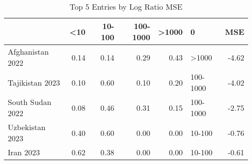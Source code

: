 \begin{table}
\centering
\caption{Top 5 Entries by Log Ratio MSE}
\label{tab:top5_mse}
\begin{tabular}{lrrrrlr}
\toprule
{} &  <10 &  10-100 &  100-1000 &  >1000 &         0 &   MSE \\
\midrule
Afghanistan 2022 & 0.14 &    0.14 &      0.29 &   0.43 &     >1000 & -4.62 \\
Tajikistan 2023  & 0.10 &    0.60 &      0.10 &   0.20 &  100-1000 & -4.02 \\
South Sudan 2022 & 0.08 &    0.46 &      0.31 &   0.15 &  100-1000 & -2.75 \\
Uzbekistan 2023  & 0.40 &    0.60 &      0.00 &   0.00 &    10-100 & -0.76 \\
Iran 2023        & 0.62 &    0.38 &      0.00 &   0.00 &    10-100 & -0.61 \\
\bottomrule
\end{tabular}
\end{table}
